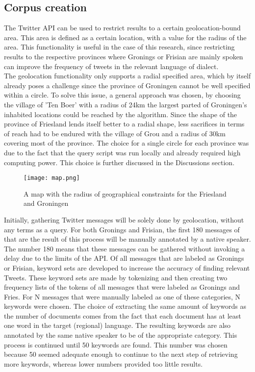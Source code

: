 \documentclass[
10pt, %
a4paper, %
oneside, %
headinclude,footinclude, %
] {book}%
\begin{document}
\subsection{Corpus creation}
The Twitter API can be used to restrict results to a certain geolocation-bound area. This area is defined as a certain location, with a value for the radius of the area. This functionality is useful in the case of this research, since restricting results to the respective provinces where Gronings or Frisian are mainly spoken can improve the frequency of tweets in the relevant language of dialect.\\
The geolocation functionality only supports a radial specified area, which by itself already poses a challenge since the province of Groningen cannot be well specified within a circle. To solve this issue, a general approach was chosen, by choosing the village of 'Ten Boer' with a radius of 24km the largest parted of Groningen's inhabited locations could be reached by the algorithm. Since the shape of the province of Friesland lends itself better to a radial shape, less sacrifices in terms of reach had to be endured with the village of Grou and a radius of 30km covering most of the province. The choice for a single circle for each province was due to the fact that the query script was run locally and already required high computing power. This choice is further discussed in the Discussions section.\\

\begin{figure}[H]
  \texttt{[image: map.png]}
  \caption{A map with the radius of geographical constraints for the Friesland and Groningen}
\end{figure}

Initially, gathering Twitter messages will be solely done by geolocation, without any terms as a query. For both Gronings and Frisian, the first 180 messages of that are the result of this process will be manually annotated by a native speaker. The number 180 means that these messages can be gathered without invoking a delay due to the limits of the API. Of all messages that are labeled as Gronings or Frisian, keyword sets are developed to increase the accuracy of finding relevant Tweets. These keyword sets are made by tokenizing and then creating two frequency lists of the tokens of all messages that were labeled as Gronings and Fries. For N messages that were manually labeled as one of these categories, N keywords were chosen. The choice of extracting the same amount of keywords as the number of documents comes from the fact that each document has at least one word in the target (regional) language. The resulting keywords are also annotated by the same native speaker to be of the appropriate category. This process is continued until 50 keywords are found. This number was chosen because 50 seemed adequate enough to continue to the next step of retrieving more keywords, whereas lower numbers provided too little results.
\end{document}
